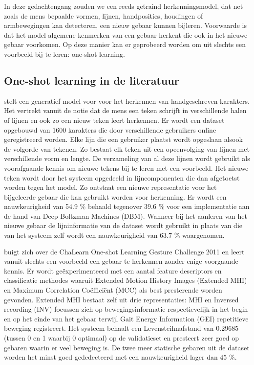 \npar In deze gedachtengang zouden we een reeds getraind herkenningsmodel, dat net zoals de mens bepaalde vormen, lijnen, handposities, houdingen of armbewegingen kan detecteren, een nieuw gebaar kunnen bijleren. Voorwaarde is dat het model algemene kenmerken van een gebaar herkent die ook in het nieuwe gebaar voorkomen. Op deze manier kan er geprobeerd worden om uit slechts een voorbeeld bij te leren: one-shot learning. 

\subsection{One-shot learning in de literatuur}
\npar \cite{oneshot-vis-concepts} stelt een generatief model voor voor het herkennen van handgeschreven karakters. Het vertrekt vanuit de notie dat de mens een teken schrijft in verschillende halen of lijnen en ook zo een nieuw teken leert herkennen. Er wordt een dataset opgebouwd van 1600 karakters die door verschillende gebruikers online geregistreerd worden. Elke lijn die een gebruiker plaatst wordt opgeslaan alsook de volgorde van tekenen. Zo bestaat elk teken uit een opeenvolging van lijnen met verschillende vorm en lengte. De verzameling van al deze lijnen wordt gebruikt als voorafgaande kennis om nieuwe tekens bij te leren met een voorbeeld. Het nieuwe teken wordt door het systeem opgedeeld in lijncomponenten die dan afgetoetst worden tegen het model. Zo ontstaat een nieuwe representatie voor het bijgeleerde gebaar die kan gebruikt worden voor herkenning. Er wordt een nauwkeurigheid van 54.9 \% behaald tegenover 39.6 \% voor een implementatie aan de hand van Deep Boltzman Machines (DBM). Wanneer bij het aanleren van het nieuwe gebaar de lijninformatie van de dataset wordt gebruikt in plaats van die van het systeem zelf wordt een nauwkeurigheid van 63.7 \% waargenomen.

\npar \cite{oneshot-gesture-rgbd} buigt zich over de ChaLearn One-shot Learning Gesture Challenge 2011 en leert vanuit slechts een voorbeeld een gebaar te herkennen zonder enige voorgaande kennis. Er wordt ge\"experimenteerd met een aantal feature descriptors en classificatie methodes waaruit Extended Motion History Images (Extended MHI) en Maximum Correlation Co\"effici\"ent (MCC) als best presterende worden gevonden. Extended MHI  bestaat zelf uit drie representaties: MHI en Inversed recording (INV) focussen zich op bewegingsinformatie respectievelijk in het begin en op het einde van het gebaar terwijl Gait Energy Information (GEI) repetitieve beweging registreert. Het systeem behaalt een Levensteihnafstand van 0.29685 (tussen 0 en 1 waarbij 0 optimaal) op de validatieset en presteert zeer goed op gebaren waarin er veel beweging is. De twee meer statische gebaren uit de dataset worden het minst goed gededecteerd met een nauwkeurigheid lager dan 45 \%.

